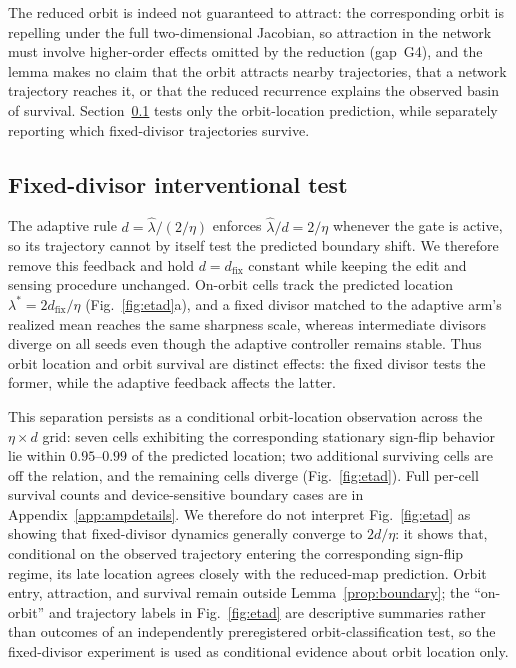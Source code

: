 \documentclass{article}
\theoremstyle{plain}
\theoremstyle{definition}
\theoremstyle{remark}
\begin{document}
The reduced orbit is indeed not guaranteed to attract: the
corresponding orbit is repelling under the full two-dimensional
Jacobian, so attraction in the network must involve higher-order
effects omitted by the reduction (gap~G4), and the lemma makes no
claim that the orbit attracts nearby trajectories, that a network
trajectory reaches it, or that the reduced recurrence explains the
observed basin of survival. Section~\ref{sub:fixedd} tests only the
orbit-location prediction, while separately reporting which
fixed-divisor trajectories survive.

\subsection{Fixed-divisor interventional test}
\label{sub:fixedd}
The adaptive rule $d=\hat{\lambda}/(2/\eta)$ enforces
$\hat{\lambda}/d=2/\eta$ whenever the gate is active, so its trajectory
cannot by itself test the predicted boundary shift. We therefore remove
this feedback and hold $d=d_{\mathrm{fix}}$ constant while keeping the
edit and sensing procedure unchanged. On-orbit cells track the
predicted location $\lambda^{*}=2d_{\mathrm{fix}}/\eta$
(Fig.~\ref{fig:etad}a), and a fixed divisor matched to the adaptive
arm's realized mean reaches the same sharpness scale, whereas
intermediate divisors diverge on all seeds even though the adaptive
controller remains stable. Thus orbit location and orbit
survival are distinct effects: the fixed divisor tests the former,
while the adaptive feedback affects the latter.

This separation persists as a conditional orbit-location observation
across the $\eta\times d$ grid: seven cells exhibiting the
corresponding stationary sign-flip behavior lie within
$0.95$--$0.99$ of the predicted location; two additional surviving
cells are off the relation, and the remaining cells diverge
(Fig.~\ref{fig:etad}). Full per-cell survival counts and
device-sensitive boundary cases are in
Appendix~\ref{app:ampdetails}. We therefore do not
interpret Fig.~\ref{fig:etad} as showing that fixed-divisor dynamics
generally converge to $2d/\eta$: it shows that, conditional on the
observed trajectory entering the corresponding sign-flip regime, its
late location agrees closely with the reduced-map prediction. Orbit
entry, attraction, and survival remain outside
Lemma~\ref{prop:boundary}; the ``on-orbit'' and trajectory labels in
Fig.~\ref{fig:etad} are descriptive summaries rather than outcomes of
an independently preregistered orbit-classification test, so the
fixed-divisor experiment is used as conditional evidence about orbit
location only.
\end{document}
